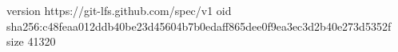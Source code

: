 version https://git-lfs.github.com/spec/v1
oid sha256:c48feaa012ddb40be23d45604b7b0edaff865dee0f9ea3ec3d2b40e273d5352f
size 41320
